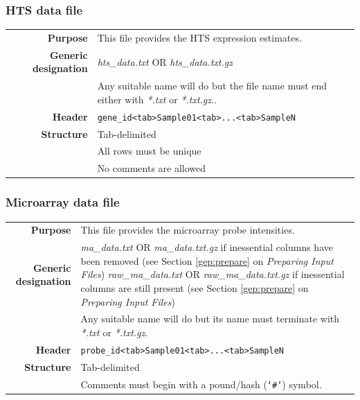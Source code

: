 \documentclass[a4paper,12pt]{article}
\begin{document}
\subsubsection{HTS data file}
\label{gep:hts}

\begin{tabular}{rp{12cm}}
\textbf{Purpose} & This file provides the HTS expression estimates.\\
\textbf{Generic designation} & \textit{hts\_data.txt} OR \textit{hts\_data.txt.gz} \\
  & Any suitable name will do but the file name must end either with \textit{*.txt} or \textit{*.txt.gz}.. \\
\textbf{Header} & \texttt{gene\_id\textless tab\textgreater Sample01\textless tab\textgreater...\textless tab\textgreater SampleN} \\
\textbf{Structure} & Tab-delimited \\
  & All rows must be unique \\
  & No comments are allowed \\
\end{tabular}

\subsubsection{Microarray data file}
\label{gep:microarray}

\begin{tabular}{rp{12cm}}
\textbf{Purpose} & This file provides the microarray probe intensities. \\
\textbf{Generic designation} & \textit{ma\_data.txt} OR \textit{ma\_data.txt.gz} if inessential columns have been removed (see Section \ref{gep:prepare} on \textit{Preparing Input Files})
\textit{raw\_ma\_data.txt} OR \textit{raw\_ma\_data.txt.gz} if inessential columns are still present (see Section \ref{gep:prepare} on \textit{Preparing Input Files}) \\
  & Any suitable name will do but its name must terminate with \textit{*.txt} or \textit{*.txt.gz}. \\
\textbf{Header} & \texttt{probe\_id\textless tab\textgreater Sample01\textless tab\textgreater...\textless tab\textgreater SampleN} \\
\textbf{Structure} & Tab-delimited \\
  & Comments must begin with a pound/hash (\texttt{`\#'}) symbol. \\
\end{tabular}
\end{document}
